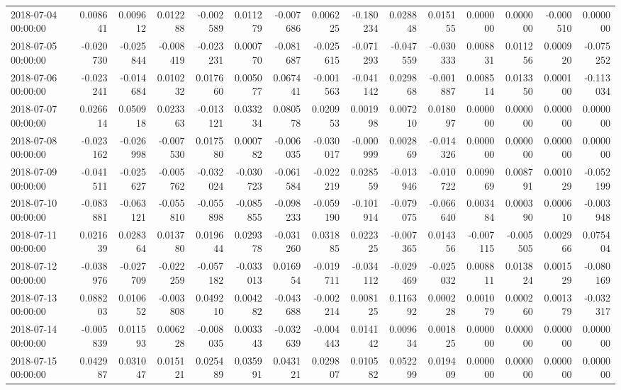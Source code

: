 \begin{tabular}{lrrrrrrrrrrrrrr}
2018-07-04 00:00:00 & 0.008641 & 0.009612 & 0.012288 & -0.002589 & 0.011279 & -0.007686 & 0.006225 & -0.180234 & 0.028848 & 0.015155 & 0.000000 & 0.000000 & -0.000510 & 0.000000 \\
2018-07-05 00:00:00 & -0.020730 & -0.025844 & -0.008419 & -0.023231 & 0.000770 & -0.081687 & -0.025615 & -0.071293 & -0.047559 & -0.030333 & 0.008831 & 0.011256 & 0.000920 & -0.075252 \\
2018-07-06 00:00:00 & -0.023241 & -0.014684 & 0.010232 & 0.017660 & 0.005077 & 0.067441 & -0.001563 & -0.041142 & 0.029868 & -0.001887 & 0.008514 & 0.013350 & 0.000100 & -0.113034 \\
2018-07-07 00:00:00 & 0.026614 & 0.050918 & 0.023363 & -0.013121 & 0.033234 & 0.080578 & 0.020953 & 0.001998 & 0.007210 & 0.018097 & 0.000000 & 0.000000 & 0.000000 & 0.000000 \\
2018-07-08 00:00:00 & -0.023162 & -0.026998 & -0.007530 & 0.017580 & 0.000782 & -0.006035 & -0.030017 & -0.000999 & 0.002869 & -0.014326 & 0.000000 & 0.000000 & 0.000000 & 0.000000 \\
2018-07-09 00:00:00 & -0.041511 & -0.025627 & -0.005762 & -0.032024 & -0.030723 & -0.061584 & -0.022219 & 0.028559 & -0.013946 & -0.010722 & 0.009069 & 0.008791 & 0.001029 & -0.052199 \\
2018-07-10 00:00:00 & -0.083881 & -0.063121 & -0.055810 & -0.055898 & -0.085855 & -0.098233 & -0.059190 & -0.101914 & -0.079075 & -0.066640 & 0.003484 & 0.000390 & 0.000610 & -0.003948 \\
2018-07-11 00:00:00 & 0.021639 & 0.028364 & 0.013780 & 0.019644 & 0.029378 & -0.031260 & 0.031885 & 0.022325 & -0.007365 & 0.014356 & -0.007115 & -0.005505 & 0.002966 & 0.075404 \\
2018-07-12 00:00:00 & -0.038976 & -0.027709 & -0.022259 & -0.057182 & -0.033013 & 0.016954 & -0.019711 & -0.034112 & -0.029469 & -0.025032 & 0.008811 & 0.013824 & 0.001529 & -0.080169 \\
2018-07-13 00:00:00 & 0.088203 & 0.010652 & -0.003808 & 0.049210 & 0.004282 & -0.043688 & -0.002214 & 0.008125 & 0.116392 & 0.000228 & 0.001079 & 0.000260 & 0.001379 & -0.032317 \\
2018-07-14 00:00:00 & -0.005839 & 0.011593 & 0.006228 & -0.008035 & 0.003343 & -0.032639 & -0.004443 & 0.014142 & 0.009634 & 0.001825 & 0.000000 & 0.000000 & 0.000000 & 0.000000 \\
2018-07-15 00:00:00 & 0.042987 & 0.031047 & 0.015121 & 0.025489 & 0.035991 & 0.043121 & 0.029807 & 0.010582 & 0.052299 & 0.019409 & 0.000000 & 0.000000 & 0.000000 & 0.000000 \\

\end{tabular}
